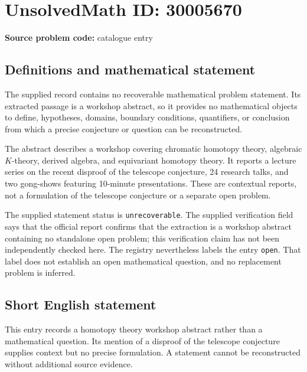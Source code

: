 \documentclass[11pt]{article}
\begin{document}
\section*{UnsolvedMath ID: 30005670}
\textbf{Source problem code:} catalogue entry
\subsection{Definitions and mathematical statement}
The supplied record contains no recoverable mathematical problem statement. Its extracted passage is a workshop abstract, so it provides no mathematical objects to define, hypotheses, domains, boundary conditions, quantifiers, or conclusion from which a precise conjecture or question can be reconstructed.

The abstract describes a workshop covering chromatic homotopy theory, algebraic \(K\)-theory, derived algebra, and equivariant homotopy theory. It reports a lecture series on the recent disproof of the telescope conjecture, 24 research talks, and two gong-shows featuring 10-minute presentations. These are contextual reports, not a formulation of the telescope conjecture or a separate open problem.

The supplied statement status is \texttt{unrecoverable}. The supplied verification field says that the official report confirms that the extraction is a workshop abstract containing no standalone open problem; this verification claim has not been independently checked here. The registry nevertheless labels the entry \texttt{open}. That label does not establish an open mathematical question, and no replacement problem is inferred.
\subsection{Short English statement}
This entry records a homotopy theory workshop abstract rather than a mathematical question. Its mention of a disproof of the telescope conjecture supplies context but no precise formulation. A statement cannot be reconstructed without additional source evidence.
\end{document}
